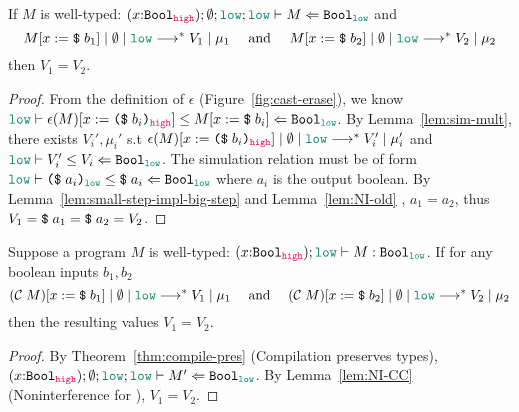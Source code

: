 \begin{lemma}
\label{lem:NI-CC}
If $M$ is well-typed:
$(x{:}\Bool_{\high}) ; \emptyset ; \low ; \low \vdash M \Leftarrow \Bool_{\low}$
and
{\normalfont
\begin{equation*}
\reducemult{M [ x := \ccconst{b_1}]}{\emptyset}{\low}{V_1}{\mu_1}
\quad\text{ and }\quad
\reducemult{M [ x := \ccconst{b_2}]}{\emptyset}{\low}{V_2}{\mu_2}
\end{equation*}}
then $V_1 = V_2$.
\end{lemma}
\begin{proof}
From the definition of $\epsilon$ (Figure~\ref{fig:cast-erase}), we know
$\simrel{\low}{\epsilon(M)[x:= \dynconst{b_i}{\high}]}{M [ x :=
    \ccconst{b_i}]}{\Bool_{\low}}$. By Lemma~\ref{lem:sim-mult}, there exists
$V_i', \mu_i'$ s.t $\reducemult{\epsilon(M)[x:=
    \dynconst{b_i}{\high}]}{\emptyset}{\low}{V_i'}{\mu_i'}$ and
$\simrel{\low}{V_i'}{V_i}{\Bool_{\low}}$. The simulation relation must be of
form $\simrel{\low}{\dynconst{a_i}{\low}}{\ccconst{a_i}}{\Bool_{\low}}$ where
$a_i$ is the output boolean. By Lemma~\ref{lem:small-step-impl-big-step} and
Lemma~\ref{lem:NI-old} , $a_1 = a_2$, thus $V_1 = \text{\texttt{{\$}}}\;{a_1} = \text{\texttt{{\$}}}\;{a_2}
= V_2$.
\end{proof}

\begin{theorem}
\label{thm:NI-Surface}
Suppose a \Surface program $M$ is well-typed:
$(x{:}\Bool_{\high}) ; \low \vdash M : \Bool_{\low}$.
If for any boolean inputs $b_1,b_2$
{\normalfont
\begin{equation*}
\reducemult{(\compile{M}) [ x := \ccconst{b_1}]}{\emptyset}{\low}{V_1}{\mu_1}
\quad\text{ and }\quad
\reducemult{(\compile{M}) [ x := \ccconst{b_2}]}{\emptyset}{\low}{V_2}{\mu_2}
\end{equation*}}
then the resulting values $V_1 = V_2$.
\end{theorem}
\begin{proof}
By Theorem~\ref{thm:compile-pres} (Compilation preserves types),
$(x{:}\Bool_{\high}) ; \emptyset ; \low ; \low \vdash M' \Leftarrow \Bool_{\low}$.
By Lemma~\ref{lem:NI-CC} (Noninterference for \CC), $V_1 = V_2$.
\end{proof}
